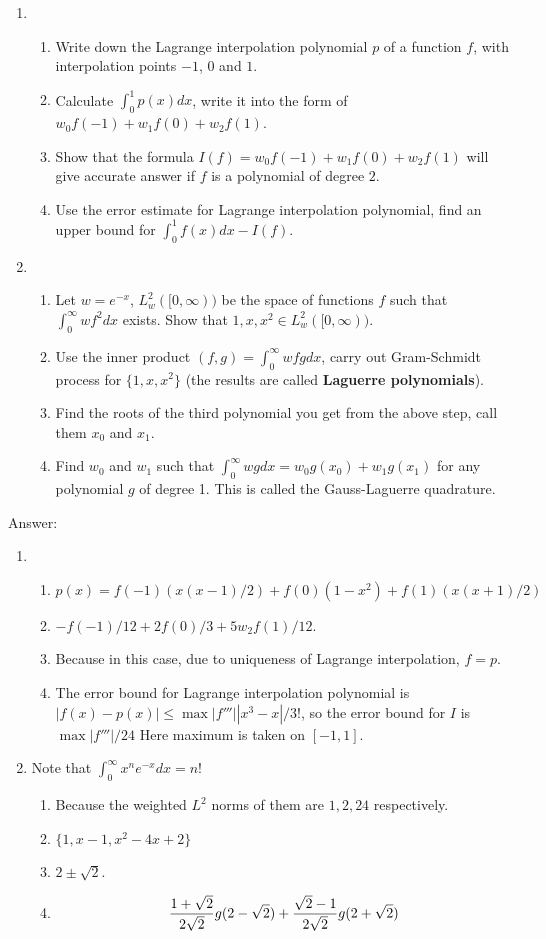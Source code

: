\documentclass[20pt]{article} %
\theoremstyle{break}
\begin{document}
\begin{enumerate}
\item \begin{enumerate}
  \item Write down the Lagrange interpolation polynomial $p$ of a function $f$, with interpolation points $-1$, $0$ and $1$.
  \item Calculate $\int_0^1p(x)dx$, write it into the form of $w_0f(-1)+w_1f(0)+w_2f(1)$.
\item Show that the formula $I(f)=w_0f(-1)+w_1f(0)+w_2f(1)$ will give accurate answer if $f$ is a polynomial of degree $2$.
  \item Use the error estimate for Lagrange interpolation polynomial, find an upper bound for $\int_0^1f(x)dx-I(f)$.
  \end{enumerate}
  \item \begin{enumerate}
    \item Let $w=e^{-x}$, $L^2_w([0, \infty))$ be the space of functions $f$ such that $\int_0^\infty wf^2dx$ exists. Show that $1, x, x^2\in L^2_w([0, \infty))$.
     \item Use the inner product $(f, g)=\int_0^\infty wfgdx$, carry out Gram-Schmidt process for $\{1, x, x^2\}$ (the results are called {\bf Laguerre polynomials}).
\item Find the roots of the third polynomial you get from the above step, call them $x_0$ and $x_1$.
    \item Find $w_0$ and $w_1$ such that $\int_0^\infty wgdx=w_0g(x_0)+w_1g(x_1)$ for any polynomial $g$ of degree 1. This is called the Gauss-Laguerre quadrature.
\end{enumerate}

\end{enumerate}
\newpage
Answer:

\begin{enumerate}
\item
 \begin{enumerate}
  \item $p(x)=f(-1)(x(x-1)/2)+f(0)(1-x^2)+f(1)(x(x+1)/2)$
  \item $-f(-1)/12+2f(0)/3+5w_2f(1)/12$.
\item Because in this case, due to uniqueness of Lagrange interpolation, $f=p$.
  \item The error bound for Lagrange interpolation polynomial is $|f(x)-p(x)|\leq\max|f'''||x^3-x|/3!$, so the error bound for $I$ is $\max|f'''|/24$ Here maximum is taken on $[-1, 1]$.
  \end{enumerate}
 
\item Note that $\int_0^\infty x^ne^{-x}dx=n!$
\begin{enumerate}
    \item Because the weighted $L^2$ norms of them are $1, 2, 24$ respectively.
     \item $\{1, x-1, x^2-4x+2\}$
\item $2\pm\sqrt{2}$.
\item \[{1+\sqrt{2}\over 2\sqrt{2}}g(2-\sqrt{2})+{\sqrt{2}-1\over 2\sqrt{2}}g(2+\sqrt{2})\]
\end{enumerate}
\end{enumerate}
\end{document}
